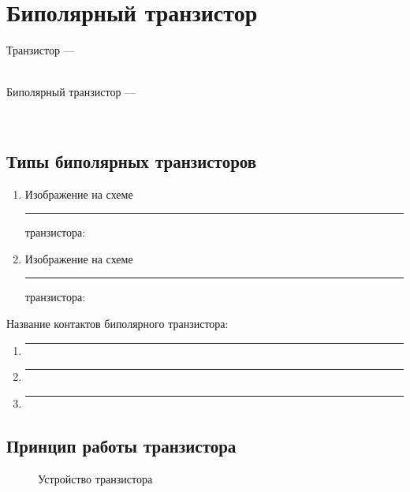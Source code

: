 \newpage

\section{Биполярный транзистор}    

Транзистор --- \hrulefill

\hrulefill

\hrulefill
\\
Биполярный транзистор --- \hrulefill

\hrulefill

\hrulefill
\\

\subsection{Типы биполярных транзисторов}

\begin{enumerate}
	\item \hrulefill

Изображение на схеме \rule{2cm}{0.25pt} транзистора:


	\item \hrulefill

Изображение на схеме \rule{2cm}{0.25pt} транзистора:

\end{enumerate}

Название контактов биполярного транзистора:

\begin{enumerate}
	\item \rule{5cm}{0.25pt}
	\item \rule{5cm}{0.25pt}
	\item \rule{5cm}{0.25pt}
\end{enumerate}

\subsection{Принцип работы транзистора}

\begin{figure}[h]
\centering
{}
\caption{Устройство транзистора}
\end{figure}

